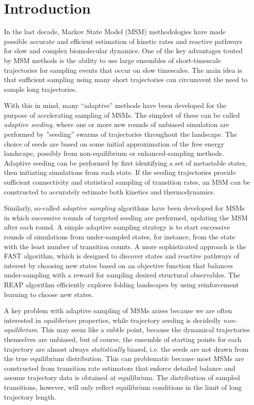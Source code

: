 \documentclass[%
 aip,
rsi,%
 amsmath,amssymb,
 reprint,%
]{revtex4-1}
\begin{document}
\section{\label{sec:level1}Introduction}
In the last decade, Markov State Model (MSM) methodologies have made possible accurate and efficient estimation of kinetic rates and reactive pathways for slow and complex biomolecular dynamics.\cite{Noe:2009en,Voelz:2010hs,Prinz:2011id,Chodera:2014gk,noe2014introduction} One of the key advantages touted by MSM methods is the ability to use large ensembles of short-timescale trajectories for sampling events that occur on slow timescales.  The main idea is that sufficient sampling using many short trajectories can circumvent the need to sample long trajectories.

With this in mind, many ``adaptive'' methods have been developed for the purpose of accelerating sampling of MSMs.  The simplest of these can be called \textit{adaptive seeding}, where one or more new rounds of unbiased simulation are performed by ''seeding'' swarms of trajectories throughout the landscape.\cite{Huang:2009bx} The choice of seeds are based on some initial approximation of the free energy landscape, possibly from non-equilibrium or enhanced-sampling methods.  Adaptive seeding can be performed by first identifying a set of metastable states, then initiating simulations from each state.  If the seeding trajectories provide sufficient connectivity and statistical sampling of transition rates, an MSM can be constructed to accurately estimate both kinetics and thermodynamics.  
 
Similarly, so-called \textit{adaptive sampling} algorithms have been developed for MSMs in which successive rounds of targeted seeding are performed, updating the MSM after each round\cite{Voelz:2014kk,Shamsi:2017jg}. A simple adaptive sampling strategy is to start successive rounds of simulations from under-sampled states, for instance, from the state with the least number of transition counts.\cite{Doerr:2014fc}  A more sophisticated approach is the FAST algorithm, which is designed to discover states and reactive pathways of interest by choosing new states based on an objective function that balances under-sampling with a reward for sampling desired structural observables.\cite{Zimmerman:2015kf,Zimmerman:2018jn} The REAP algorithm efficiently explores folding landscapes by using reinforcement learning to choose new states.\cite{shamsi2017reinforcement}

A key problem with adaptive sampling of MSMs arises because we are often interested in \textit{equilibrium} properties, while trajectory seeding is decidedly \textit{non-equilibrium}.  This may seem like a subtle point, because the dynamical trajectories themselves are unbiased, but of course, the ensemble of starting points for each trajectory are almost always \textit{statistically} biased, i.e. the seeds are not drawn from the true equilibrium distribution.  This can problematic because most MSMs are constructed from transition rate estimators that enforce detailed balance and assume trajectory data is obtained at equilibrium. The distribution of sampled transitions, however, will only reflect equilibrium conditions in the limit of long trajectory length.
\end{document}

